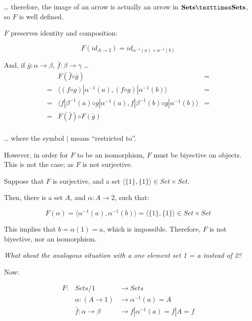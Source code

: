 \documentclass[notitlepage,a4paper]{article}
\begin{document}
\begin{enumerate}
    … therefore, the image of an arrow is actually an arrow in ${\bf Sets × Sets}$, so $F$ is well defined.
    
    $F$ preserves identity and composition:

    $$F(id_{A→2}) = id_{α^{-1}(a)×α^{-1}(b)}$$

    And, if $\bar{g} : α → β$, $\bar{f} : β → γ$ …
    \begin{equation*}
    \begin{array}{rcl}
       & F(\bar{f} ◦ \bar{g})                        & = \\
    =  & \langle (f ◦ g)|α^{-1}(a), (f ◦ g)|α^{-1}(b) \rangle        & = \\
    =  & \langle f|β^{-1}(a) ◦ g|α^{-1}(a), f|β^{-1}(b) ◦ g|α^{-1}(b) \rangle & = \\
    =  & F(\bar{f}) ◦ F(\bar{g}) & \\ 
    \end{array}
    \end{equation*}

    … where the symbol $|$ means “restricted to”.
    
    However, in order for $F$ to be an isomorphism, $F$ must be biyective
    on objects. This is not the case; as $F$ is not
    surjective.

    Suppose that $F$ is surjective, and a set $\langle \{1\}, \{1\} \rangle ∈ Set × Set$.

    Then, there is a set $A$, and $α : A → 2$, such that:

    $$F(α) = \langle α^{-1}(a), α^{-1}(b) \rangle = \langle \{1\}, \{1\} \rangle ∈ Set × Set$$

    This implies that $b = α(1) = a$, which is impossible. Therefore,
    $F$ is not biyective, nor an isomorphism.


    

   
{\em What about the analogous situation with a one element set 1 = {a} instead of 2?}

    Now:

    \begin{equation*}
    \begin{array}{rll}
      F : & Sets/1           & → Sets                   \\
          & α : (A → 1)      & → α^{-1}(a)   = A         \\
          & \bar{f} : α → β  & → f|α^{-1}(a) = f|A  = f  \\
    \end{array}
    \end{equation*}


\end{enumerate}
\end{document}
